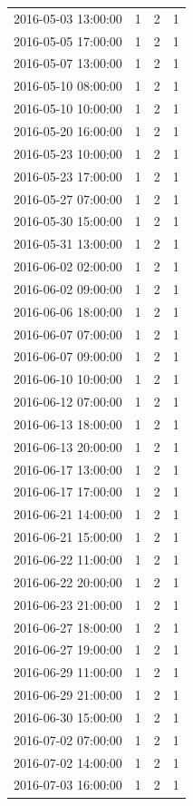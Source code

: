 \begin{tabular}{lrrr}
2016-05-03 13:00:00 & 1 & 2 & 1 \\
2016-05-05 17:00:00 & 1 & 2 & 1 \\
2016-05-07 13:00:00 & 1 & 2 & 1 \\
2016-05-10 08:00:00 & 1 & 2 & 1 \\
2016-05-10 10:00:00 & 1 & 2 & 1 \\
2016-05-20 16:00:00 & 1 & 2 & 1 \\
2016-05-23 10:00:00 & 1 & 2 & 1 \\
2016-05-23 17:00:00 & 1 & 2 & 1 \\
2016-05-27 07:00:00 & 1 & 2 & 1 \\
2016-05-30 15:00:00 & 1 & 2 & 1 \\
2016-05-31 13:00:00 & 1 & 2 & 1 \\
2016-06-02 02:00:00 & 1 & 2 & 1 \\
2016-06-02 09:00:00 & 1 & 2 & 1 \\
2016-06-06 18:00:00 & 1 & 2 & 1 \\
2016-06-07 07:00:00 & 1 & 2 & 1 \\
2016-06-07 09:00:00 & 1 & 2 & 1 \\
2016-06-10 10:00:00 & 1 & 2 & 1 \\
2016-06-12 07:00:00 & 1 & 2 & 1 \\
2016-06-13 18:00:00 & 1 & 2 & 1 \\
2016-06-13 20:00:00 & 1 & 2 & 1 \\
2016-06-17 13:00:00 & 1 & 2 & 1 \\
2016-06-17 17:00:00 & 1 & 2 & 1 \\
2016-06-21 14:00:00 & 1 & 2 & 1 \\
2016-06-21 15:00:00 & 1 & 2 & 1 \\
2016-06-22 11:00:00 & 1 & 2 & 1 \\
2016-06-22 20:00:00 & 1 & 2 & 1 \\
2016-06-23 21:00:00 & 1 & 2 & 1 \\
2016-06-27 18:00:00 & 1 & 2 & 1 \\
2016-06-27 19:00:00 & 1 & 2 & 1 \\
2016-06-29 11:00:00 & 1 & 2 & 1 \\
2016-06-29 21:00:00 & 1 & 2 & 1 \\
2016-06-30 15:00:00 & 1 & 2 & 1 \\
2016-07-02 07:00:00 & 1 & 2 & 1 \\
2016-07-02 14:00:00 & 1 & 2 & 1 \\
2016-07-03 16:00:00 & 1 & 2 & 1 \\

\end{tabular}
